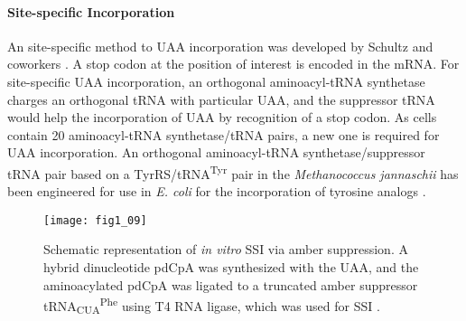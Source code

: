 \begin{refsection}
\paragraph{ Site-specific Incorporation}
An  site-specific method to UAA incorporation was developed by
Schultz and coworkers \cite{Wang2001,Wang2002}. A stop codon at the position of
interest is encoded in the mRNA. For  site-specific UAA
incorporation, an orthogonal aminoacyl-tRNA synthetase charges an orthogonal
tRNA with particular UAA, and the suppressor tRNA would help the incorporation
of UAA by recognition of a stop codon. As cells contain 20 aminoacyl-tRNA
synthetase/tRNA pairs, a new one is required for UAA incorporation. An
orthogonal aminoacyl-tRNA synthetase/suppressor tRNA pair based on a
TyrRS/tRNA\textsuperscript{Tyr} pair in the \emph{Methanococcus jannaschii} has
been engineered for use in \emph{E.  coli} for the incorporation of tyrosine
analogs \cite{Wang2001}.
\begin{figure}[htbp] \centering \texttt{[image: fig1\_09]}
    \caption[Schematic representation of \emph{in vitro} SSI via amber
        suppression. A hybrid dinucleotide pdCpA was synthesized with the UAA,
        and the aminoacylated pdCpA was ligated to a truncated amber suppressor
        tRNA\textsubscript{CUA}\textsuperscript{Phe} using T4 RNA ligase, which
        was used for SSI.]{Schematic representation of \emph{in vitro} SSI via
        amber suppression. A hybrid dinucleotide pdCpA was synthesized with the
        UAA, and the aminoacylated pdCpA was ligated to a truncated amber
        suppressor tRNA\textsubscript{CUA}\textsuperscript{Phe} using T4 RNA
        ligase, which was used for SSI \cite{Theato2013,Wang2001}.} 
    \label{fig:ssi-intro} 
\end{figure}


\end{refsection}
